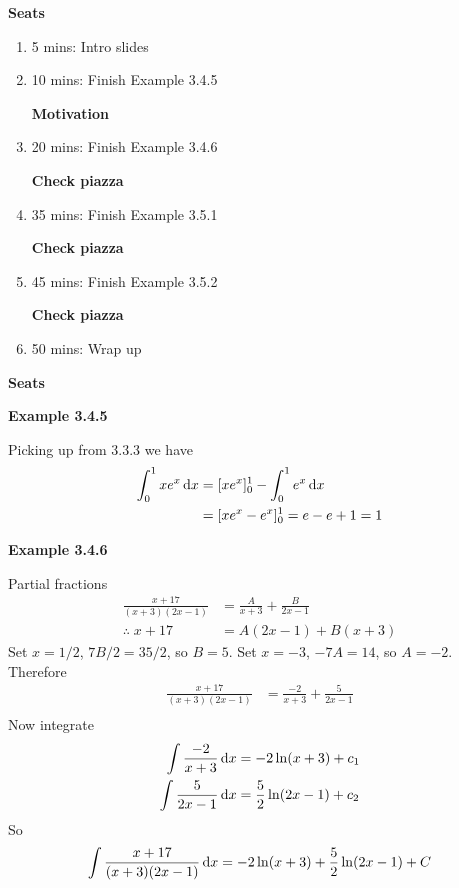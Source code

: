 \textbf{Seats}
\begin{enumerate}
    \item 5 mins: Intro slides \par
    \item 10 mins: Finish Example 3.4.5 \par
    \textbf{Motivation}
    \item 20 mins: Finish Example 3.4.6 \par
    \textbf{Check piazza}
    \item 35 mins: Finish Example 3.5.1 \par
    \textbf{Check piazza}
    \item 45 mins: Finish Example 3.5.2 \par
    \textbf{Check piazza}
    \item 50 mins: Wrap up \par
\end{enumerate}
\textbf{Seats}

\vspace{10mm}
\textbf{Example 3.4.5}

Picking up from 3.3.3 we have
\begin{align*}
    \int_0^1 x e^x \, {\rm d}x &= [x e^x]_0^1 - \int_0^1 e^x \, {\rm d} x\\
    &= [x e^x - e^x]_0^1 = e - e + 1 = 1
\end{align*}

\vspace{10mm}
\textbf{Example 3.4.6}

Partial fractions
\begin{align*}
    \frac{x+17}{(x+3)(2x-1)} &= \frac{A}{x+3} + \frac{B}{2x-1} \\
    \therefore \; x+17 &= A(2x-1) + B(x+3)
\end{align*}
Set $x = 1/2$, $7B/2 = 35/2$, so $B = 5$.
Set $x = -3$, $-7A = 14$, so $A = -2$. Therefore
\begin{align*}
    \frac{x+17}{(x+3)(2x-1)} &= \frac{-2}{x+3} + \frac{5}{2x-1} \\
\end{align*}
Now integrate
\begin{align*}
    \int \frac{-2}{x+3} \, {\rm d}x &= -2\ln (x+3) + c_1\\
    \int \frac{5}{2x-1} \, {\rm d}x &= \frac{5}{2} \ln(2x-1) + c_2
\end{align*}
So 
\begin{align*}
\int \frac{x+17}{(x+3)(2x-1)} \, {\rm d}x = -2\ln (x+3) + \frac{5}{2} \ln(2x-1) + C
\end{align*}

